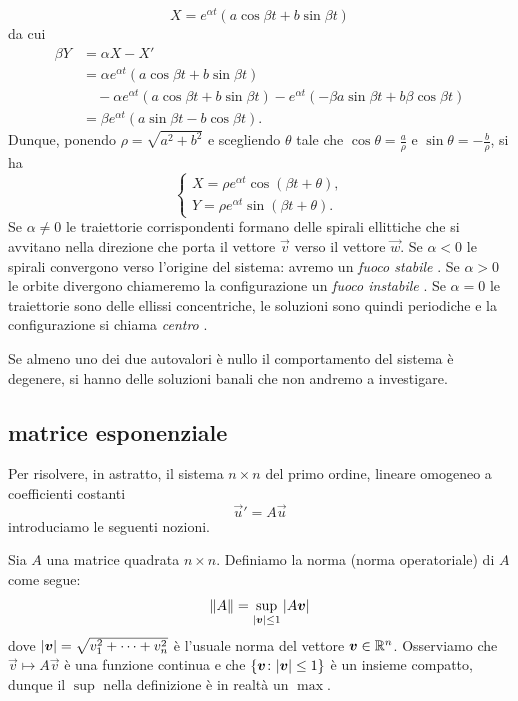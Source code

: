 \[
X = e^{\alpha t}(a \cos \beta t + b \sin \beta t)
\]
da cui
\begin{align*}
\beta Y
&= \alpha X - X'\\
& = \alpha e^{\alpha t}(a \cos \beta t + b \sin \beta t) \\
&\quad - \alpha e^{\alpha t}(a\cos \beta t + b \sin \beta t)
  - e^{\alpha t}(-\beta a \sin \beta t + b \beta \cos \beta t) \\
 &= \beta e^{\alpha t}(a\sin \beta t - b \cos \beta t).
\end{align*}
Dunque, ponendo $\rho=\sqrt{a^2+b^2}$ e scegliendo $\theta$
tale che $\cos \theta = \frac a \rho$ e $\sin \theta = - \frac b \rho$,
si ha
\[
  \begin{cases}
   X = \rho e^{\alpha t} \cos(\beta t + \theta),\\
   Y = \rho e^{\alpha t} \sin(\beta t + \theta).
  \end{cases}
\]
Se $\alpha \neq 0$ le traiettorie corrispondenti formano delle spirali
ellittiche che si avvitano nella direzione che porta il vettore $\vec v$ verso
il vettore $\vec w$. Se $\alpha < 0$ le spirali convergono verso l'origine del
sistema: avremo un \emph{fuoco stabile}%
. Se $\alpha >0$ le orbite
divergono chiameremo la configurazione un \emph{fuoco instabile}%
.
Se $\alpha = 0$ le traiettorie sono delle ellissi concentriche,
le soluzioni sono quindi periodiche e la configurazione
si chiama \emph{centro}%
.

Se almeno uno dei due autovalori è nullo il comportamento del sistema è degenere,
si hanno delle soluzioni banali che non andremo a investigare.

\subsection{matrice esponenziale}

Per risolvere, in astratto, il sistema $n\times n$ del primo ordine, 
lineare omogeneo a coefficienti costanti
\[
  \vec u' = A \vec u
\]
introduciamo le seguenti nozioni.

Sia $A$ una matrice quadrata $n\times n$. Definiamo la norma (norma
operatoriale) di $A$ come segue:
\[
  {\left\Vert  A \right\Vert} = \sup_{{\left|\boldsymbol v\right|} \le 1} {\left|A\boldsymbol v\right|}
\]
dove ${\left| \boldsymbol v\right|} = \sqrt{v_1^2+ \dots + v_n^2}$ è l'usuale norma del
vettore $\boldsymbol v\in {\mathbb R}^n$.
Osserviamo che $\vec v\mapsto A\vec v$ è una funzione
continua e che ${\left\{ \boldsymbol v\colon {\left| \boldsymbol v\right|} \le 1 \right\}}$ è un insieme
compatto, dunque il $\sup$ nella definizione è in realtà un $\max$.

